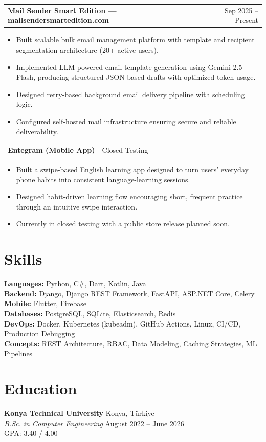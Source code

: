 \documentclass[10pt,a4paper]{extarticle}
\makeatletter
\newcommand{\entry}[2]{%
\noindent\begin{tabular*}{\textwidth}{@{\extracolsep{\fill}}lr}
\textbf{#1} & #2\\
\end{tabular*}
}
\makeatother
\begin{document}
\entry{Mail Sender Smart Edition \textnormal{---} \href{https://mailsendersmartedition.com}{mailsendersmartedition.com}}{Sep 2025 -- Present}
\begin{itemize}[leftmargin=*,noitemsep,topsep=0pt]
\item Built scalable bulk email management platform with template and recipient segmentation architecture (20+ active users).
\item Implemented LLM-powered email template generation using Gemini 2.5 Flash, producing structured JSON-based drafts with optimized token usage.
\item Designed retry-based background email delivery pipeline with scheduling logic.
\item Configured self-hosted mail infrastructure ensuring secure and reliable deliverability.
\end{itemize}

\entry{Entegram (Mobile App)}{Closed Testing}
\begin{itemize}[leftmargin=*,noitemsep,topsep=0pt]
\item Built a swipe-based English learning app designed to turn users' everyday phone habits into consistent language-learning sessions.
\item Designed habit-driven learning flow encouraging short, frequent practice through an intuitive swipe interaction.
\item Currently in closed testing with a public store release planned soon.
\end{itemize}

\section{Skills}
\textbf{Languages:} Python, C\#, Dart, Kotlin, Java\\
\textbf{Backend:} Django, Django REST Framework, FastAPI, ASP.NET Core, Celery\\
\textbf{Mobile:} Flutter, Firebase\\
\textbf{Databases:} PostgreSQL, SQLite, Elasticsearch, Redis\\
\textbf{DevOps:} Docker, Kubernetes (kubeadm), GitHub Actions, Linux, CI/CD, Production Debugging\\
\textbf{Concepts:} REST Architecture, RBAC, Data Modeling, Caching Strategies, ML Pipelines

\section{Education}
\textbf{Konya Technical University} \hfill Konya, Türkiye\\
\textit{B.Sc. in Computer Engineering} \hfill August 2022 -- June 2026\\
GPA: 3.40 / 4.00
\end{document}
